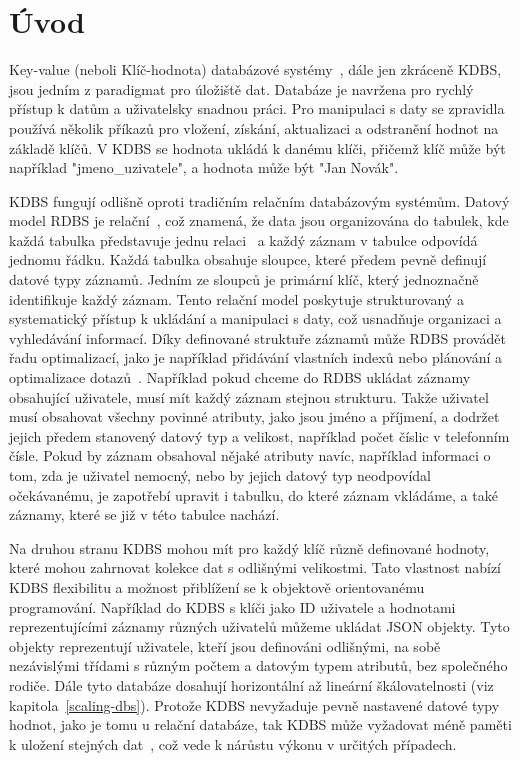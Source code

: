 \documentclass[czech,master,dept460,male,csharp,cpdeclaration]{diploma}
\begin{document}
	
	\MakeTitlePages
	
	\listoffigures
	\listoftables
	
	\chapter{Úvod}
	
	Key-value (neboli Klíč-hodnota) databázové systémy~\cite{amaz-key-value-db, ytb-nosql-db}, dále jen zkráceně KDBS, jsou jedním z paradigmat pro úložiště dat. Databáze je navržena pro rychlý přístup k datům a uživatelsky snadnou práci. Pro manipulaci s daty se zpravidla používá několik příkazů pro vložení, získání, aktualizaci a odstranění hodnot na základě klíčů. V KDBS se hodnota ukládá k danému klíči, přičemž klíč může být například "jmeno\_uzivatele", a hodnota může být "Jan Novák".
	
	KDBS fungují odlišně oproti tradičním relačním databázovým systémům. Datový model RDBS je relační~\cite{rdbs}, což znamená, že data jsou organizována do tabulek, kde každá tabulka představuje jednu relaci~\cite{relace} a každý záznam v tabulce odpovídá jednomu řádku. Každá tabulka obsahuje sloupce, které předem pevně definují datové typy záznamů. Jedním ze sloupců je primární klíč, který jednoznačně identifikuje každý záznam. Tento relační model poskytuje strukturovaný a systematický přístup k ukládání a manipulaci s daty, což usnadňuje organizaci a vyhledávání informací. Díky definované struktuře záznamů může RDBS provádět řadu optimalizací, jako je například přidávání vlastních indexů nebo plánování a optimalizace dotazů~\cite{rdbs-optimalizace}. Například pokud chceme do RDBS ukládat záznamy obsahující uživatele, musí mít každý záznam stejnou strukturu. Takže uživatel musí obsahovat všechny povinné atributy, jako jsou jméno a příjmení, a dodržet jejich předem stanovený datový typ a velikost, například počet číslic v telefonním čísle. Pokud by záznam obsahoval nějaké atributy navíc, například informaci o tom, zda je uživatel nemocný, nebo by jejich datový typ neodpovídal očekávanému, je zapotřebí upravit i tabulku, do které záznam vkládáme, a také záznamy, které se již v této tabulce nachází.
	
	Na druhou stranu KDBS mohou mít pro každý klíč různě definované hodnoty, které mohou zahrnovat kolekce dat s odlišnými velikostmi. Tato vlastnost nabízí KDBS flexibilitu a možnost přiblížení se k objektově orientovanému programování. Například do KDBS s klíči jako ID uživatele a hodnotami reprezentujícími záznamy různých uživatelů můžeme ukládat JSON objekty. Tyto objekty reprezentují uživatele, kteří jsou definováni odlišnými, na sobě nezávislými třídami s různým počtem a datovým typem atributů, bez společného rodiče. Dále tyto databáze dosahují horizontální až lineární škálovatelnosti (viz kapitola~\ref{scaling-dbs}). Protože KDBS nevyžaduje pevně nastavené datové typy hodnot, jako je tomu u relační databáze, tak KDBS může vyžadovat méně paměti k uložení stejných dat~\cite{kdbs-memory}, což vede k nárůstu výkonu v určitých případech.
	
\end{document}
